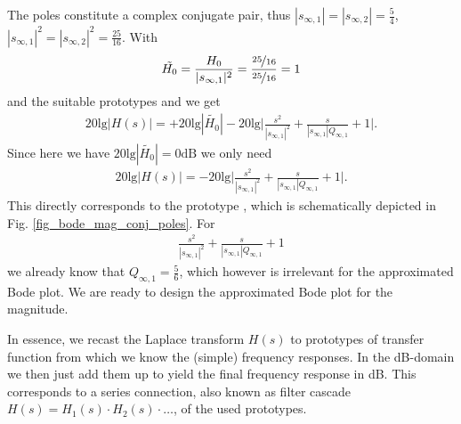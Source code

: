 \begin{ExCalc}
The poles constitute a complex conjugate pair, thus
$|s_{\infty,1}| = |s_{\infty,2}| = \frac{5}{4}$, $|s_{\infty,1}|^2 = |s_{\infty,2}|^2 = \frac{25}{16}$.
%
With 
\begin{align}
\tilde{H_0} = \frac{H_0}{|s_{\infty,1}|^2} = \frac{\nicefrac{25}{16}}{\nicefrac{25}{16}} = 1
\end{align}
and the suitable prototypes  and 
we get
\begin{align}
20 \text{lg} |H(s)| =
+20 \text{lg} |\tilde{H_0}|
-20 \text{lg} \bigg|\frac{s^2}{|s_{\infty,1}|^2} + \frac{s}{|s_{\infty,1}| Q_{\infty,1}} + 1\bigg|.
\end{align}
Since here we have $20 \text{lg} |\tilde{H_0}|=0\mathrm{dB}$ we only need
\begin{align}
20 \text{lg} |H(s)| =
-20 \text{lg} \bigg|\frac{s^2}{|s_{\infty,1}|^2} + \frac{s}{|s_{\infty,1}| Q_{\infty,1}} + 1\bigg|.
\end{align}
This directly corresponds to the prototype , which
is schematically depicted in Fig. \ref{fig_bode_mag_conj_poles}.
For
\begin{align}
\frac{s^2}{|s_{\infty,1}|^2} + \frac{s}{|s_{\infty,1}| Q_{\infty,1}} + 1
\end{align}
we already know that $Q_{\infty,1}=\frac{5}{6}$, which however is irrelevant for the
approximated Bode plot.
%
%
We are ready to design the approximated Bode plot for the magnitude.

In essence, we recast the Laplace transform $H(s)$ to prototypes of transfer function
from which we know the (simple) frequency responses. In the dB-domain
we then just add them up to yield the final frequency response in dB.
This corresponds to a series connection, also known as filter cascade
$H(s)=H_1(s)\cdot H_2(s)\cdot\dots$, of the used prototypes.

%
\end{ExCalc}
